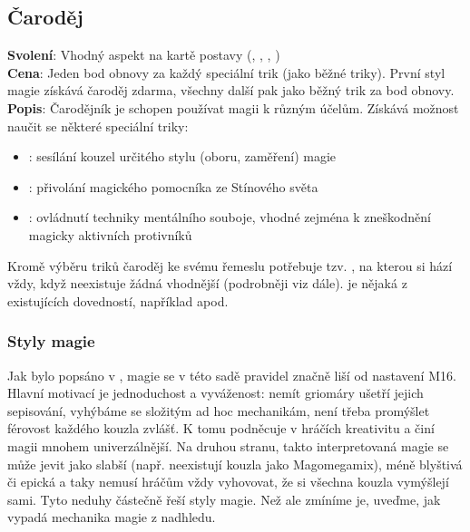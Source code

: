 \documentclass[../main.tex]{subfiles}
\begin{document}
\begin{tcolorbox}
\subsection{Čaroděj}
\label{sec:pov-carodej}
\textbf{Svolení}: Vhodný aspekt na kartě postavy (, , , )\\
\textbf{Cena}: Jeden bod obnovy za každý speciální trik (jako běžné triky). První styl magie získává čaroděj zdarma, všechny další pak jako běžný trik za bod obnovy.\\
\textbf{Popis}: Čarodějník je schopen používat magii k různým účelům. Získává možnost naučit se některé speciální triky:
\begin{itemize}
\item {}: sesílání kouzel určitého stylu (oboru, zaměření) magie
\item {}: přivolání magického pomocníka ze Stínového světa
\item {}: ovládnutí techniky mentálního souboje, vhodné zejména k zneškodnění magicky aktivních protivníků
\end{itemize}
Kromě výběru triků čaroděj ke svému řemeslu potřebuje tzv. , na kterou si hází vždy, když neexistuje žádná vhodnější (podrobněji viz dále).  je nějaká z existujících dovedností, například  apod. 
\end{tcolorbox}

\subsubsection*{Styly magie}
\label{stylymagie}

Jak bylo popsáno v , magie se v této sadě pravidel značně liší od nastavení M16. Hlavní motivací je jednoduchost a vyváženost: nemít griomáry ušetří jejich sepisování, vyhýbáme se složitým ad hoc mechanikám, není třeba promýšlet férovost každého kouzla zvlášť. K tomu podněcuje v hráčích kreativitu a činí magii mnohem univerzálnější. Na druhou stranu, takto interpretovaná magie se může jevit jako slabší (např. neexistují kouzla jako Magomegamix), méně blyštivá či epická a taky nemusí hráčům vždy vyhovovat, že si všechna kouzla vymýšlejí sami. Tyto neduhy částečně řeší styly magie. Než ale zmíníme je, uveďme, jak vypadá mechanika magie z nadhledu.\\
\end{document}
